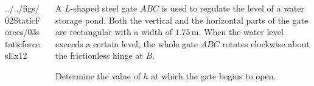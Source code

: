 \documentclass[9pt,xcolor={svgnames, x11names},professionalfonts, mathserif]{beamer}
\begin{document}
\begin{frame}
	\begin{columns}
		\begin{column}{0.55\textwidth}
			\vspace{0.375cm}
			\begin{mybox}[colframe=example, colbacktitle=example!80!white]
				\begin{cfig}[0.35]{../../figs/02StaticForces/03staticforcesEx12}\end{cfig}
			\end{mybox}
		\end{column}
		\begin{column}{0.45\textwidth}
			\begin{myexam}[colframe=example, colbacktitle=example!80!white]{}{}
				\raggedright
				A $L$-shaped steel gate $ABC$ is used to regulate the level of a water storage pond.
				Both the vertical and the horizontal parts of the gate are rectangular with a width of $1.75\,\text{m}$.
				When the water level exceeds a certain level, the whole gate $ABC$ rotates clockwise about the frictionless hinge at $B$.
				\par \bigskip
				Determine the value of $h$ at which the gate begins to open.
			\end{myexam}
		\end{column}
	\end{columns}
	
\end{frame}
\end{document}
